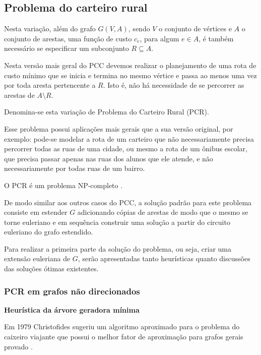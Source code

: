     \subsection{Problema do carteiro rural}
    
    Nesta variação, além do grafo $G(V, A)$, sendo $V$ o conjunto de vértices e $A$ o conjunto de arestas, uma função de custo $c_e$, para algum $e\in A$, é também necessário se especificar um subconjunto $R \subseteq A$. 

    Nesta versão mais geral do PCC devemos realizar o planejamento de uma rota de custo mínimo que se inicia e termina no mesmo vértice e passa ao menos uma vez por toda aresta pertencente a $R$. 
    Isto é, não há necessidade de se percorrer as arestas de $A \setminus R$.

    Denomina-se esta variação de Problema do Carteiro Rural (PCR).

    Esse problema possui aplicações mais gerais que a sua versão original, por exemplo: pode-se modelar a rota de um carteiro que não necessariamente precisa percorrer todas as ruas de uma cidade, ou mesmo a rota de um ônibus escolar, que precisa passar apenas nas ruas dos alunos que ele atende, e não necessariamente por todas ruas de um bairro.

    O PCR é um problema NP-completo \cite{rural-np-complete}. %

    De modo similar aos outros casos do PCC, a solução padrão para este problema consiste em estender $G$ adicionando cópias de arestas de modo que o mesmo se torne euleriano e em sequência construir uma solução a partir do circuito euleriano do grafo estendido.

    Para realizar a primeira parte da solução do problema, ou seja, criar uma extensão euleriana de $G$, serão apresentadas tanto heurísticas quanto discussões das soluções ótimas existentes.

        \subsubsection{PCR em grafos não direcionados}


        \textbf{Heurística da árvore geradora mínima}

        Em 1979 Christofides sugeriu um algoritmo aproximado para o problema do caixeiro viajante que possui o melhor fator de aproximação para grafos gerais provado \cite{wiki-christofides}. %

